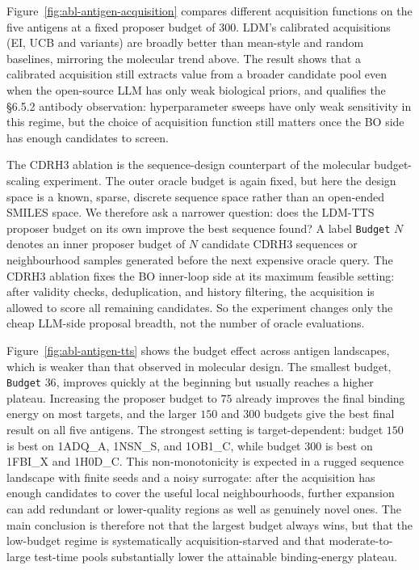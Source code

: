 Figure~\ref{fig:abl-antigen-acquisition} compares different acquisition functions on the five antigens at a fixed proposer budget of $300$. LDM's calibrated acquisitions (EI, UCB and variants) are broadly better than mean-style and random baselines, mirroring the molecular trend above. The result shows that a calibrated acquisition still extracts value from a broader candidate pool even when the open-source LLM has only weak biological priors, and qualifies the §6.5.2 antibody observation: hyperparameter sweeps have only weak sensitivity in this regime, but the choice of acquisition function still matters once the BO side has enough candidates to screen.

The CDRH3 ablation is the sequence-design counterpart of the molecular budget-scaling experiment. The outer oracle budget is again fixed, but here the design space is a known, sparse, discrete sequence space rather than an open-ended SMILES space. We therefore ask a narrower question: does the LDM-TTS proposer budget on its own improve the best sequence found? A label \texttt{Budget} \(N\) denotes an inner proposer budget of \(N\) candidate CDRH3 sequences or neighbourhood samples generated before the next expensive oracle query. The CDRH3 ablation fixes the BO inner-loop side at its maximum feasible setting: after validity checks, deduplication, and history filtering, the acquisition is allowed to score all remaining candidates. So the experiment changes only the cheap LLM-side proposal breadth, not the number of oracle evaluations.

Figure~\ref{fig:abl-antigen-tts} shows the budget effect across antigen landscapes, which is weaker than that observed in molecular design. The smallest budget, \texttt{Budget} $36$, improves quickly at the beginning but usually reaches a higher plateau. Increasing the proposer budget to $75$ already improves the final binding energy on most targets, and the larger $150$ and $300$ budgets give the best final result on all five antigens. The strongest setting is target-dependent: budget $150$ is best on 1ADQ\_A, 1NSN\_S, and 1OB1\_C, while budget $300$ is best on 1FBI\_X and 1H0D\_C. This non-monotonicity is expected in a rugged sequence landscape with finite seeds and a noisy surrogate: after the acquisition has enough candidates to cover the useful local neighbourhoods, further expansion can add redundant or lower-quality regions as well as genuinely novel ones. The main conclusion is therefore not that the largest budget always wins, but that the low-budget regime is systematically acquisition-starved and that moderate-to-large test-time pools substantially lower the attainable binding-energy plateau.

